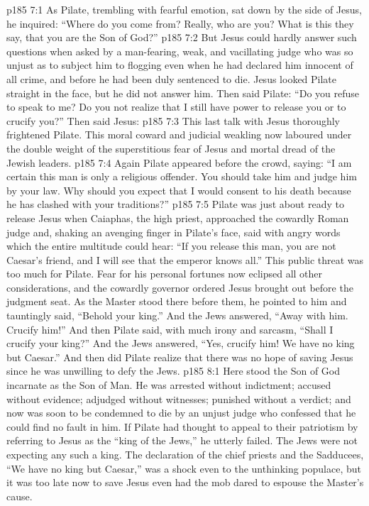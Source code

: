 \vs p185 7:1 As Pilate, trembling with fearful emotion, sat down by the side of Jesus, he inquired: “Where do you come from? Really, who are you? What is this they say, that you are the Son of God?”
\vs p185 7:2 But Jesus could hardly answer such questions when asked by a man\hyp{}fearing, weak, and vacillating judge who was so unjust as to subject him to flogging even when he had declared him innocent of all crime, and before he had been duly sentenced to die. Jesus looked Pilate straight in the face, but he did not answer him. Then said Pilate: “Do you refuse to speak to me? Do you not realize that I still have power to release you or to crucify you?” Then said Jesus: 
\vs p185 7:3 This last talk with Jesus thoroughly frightened Pilate. This moral coward and judicial weakling now laboured under the double weight of the superstitious fear of Jesus and mortal dread of the Jewish leaders.
\vs p185 7:4 Again Pilate appeared before the crowd, saying: “I am certain this man is only a religious offender. You should take him and judge him by your law. Why should you expect that I would consent to his death because he has clashed with your traditions?”
\vs p185 7:5 Pilate was just about ready to release Jesus when Caiaphas, the high priest, approached the cowardly Roman judge and, shaking an avenging finger in Pilate’s face, said with angry words which the entire multitude could hear: “If you release this man, you are not Caesar’s friend, and I will see that the emperor knows all.” This public threat was too much for Pilate. Fear for his personal fortunes now eclipsed all other considerations, and the cowardly governor ordered Jesus brought out before the judgment seat. As the Master stood there before them, he pointed to him and tauntingly said, “Behold your king.” And the Jews answered, “Away with him. Crucify him!” And then Pilate said, with much irony and sarcasm, “Shall I crucify your king?” And the Jews answered, “Yes, crucify him! We have no king but Caesar.” And then did Pilate realize that there was no hope of saving Jesus since he was unwilling to defy the Jews.
\vs p185 8:1 Here stood the Son of God incarnate as the Son of Man. He was arrested without indictment; accused without evidence; adjudged without witnesses; punished without a verdict; and now was soon to be condemned to die by an unjust judge who confessed that he could find no fault in him. If Pilate had thought to appeal to their patriotism by referring to Jesus as the “king of the Jews,” he utterly failed. The Jews were not expecting any such a king. The declaration of the chief priests and the Sadducees, “We have no king but Caesar,” was a shock even to the unthinking populace, but it was too late now to save Jesus even had the mob dared to espouse the Master’s cause.
